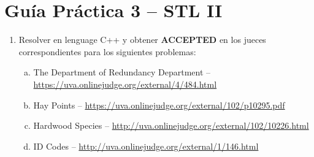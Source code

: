 




\section*{Gu\'ia Pr\'actica 3 -- STL II}

\begin{enumerate}[1 -]
	
	\item Resolver en lenguage C++ y obtener \textbf{ACCEPTED} en los jueces correspondientes para los siguientes problemas:
	
	\begin{enumerate}[a)]	
			\item The Department of Redundancy Department -- \\
				\href{https://uva.onlinejudge.org/external/4/484.html}{https://uva.onlinejudge.org/external/4/484.html}
		\item Hay Points -- \href{https://uva.onlinejudge.org/external/102/p10295.pdf}{https://uva.onlinejudge.org/external/102/p10295.pdf}

		\item Hardwood Species -- \href{http://uva.onlinejudge.org/external/102/10226.html}{http://uva.onlinejudge.org/external/102/10226.html} 
		\item ID Codes -- \href{http://uva.onlinejudge.org/external/1/146.html}{http://uva.onlinejudge.org/external/1/146.html}




\end{enumerate}
\end{enumerate}
